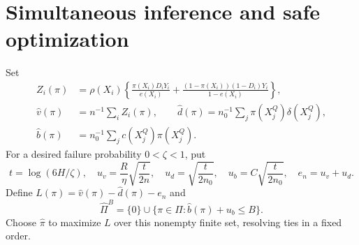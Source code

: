 \documentclass[11pt]{article}
\theoremstyle{remark}
\begin{document}
\section{Simultaneous inference and safe optimization}
Set
\begin{align*}
 Z_i(\pi)&=\rho(X_i)\left\{
 \frac{\pi(X_i)D_iY_i}{e(X_i)}+
 \frac{(1-\pi(X_i))(1-D_i)Y_i}{1-e(X_i)}\right\},\\
 \widehat v(\pi)&=n^{-1}\sum_i Z_i(\pi),\qquad
 \widehat d(\pi)=n_0^{-1}\sum_j\pi(X_j^Q)\delta(X_j^Q),\\
 \widehat b(\pi)&=n_0^{-1}\sum_jc(X_j^Q)\pi(X_j^Q).
\end{align*}
For a desired failure probability $0<\zeta<1$, put
\[
 t=\log(6H/\zeta),\quad
 u_v=\frac R\eta\sqrt{\frac{t}{2n}},\quad
 u_d=\sqrt{\frac{t}{2n_0}},\quad
 u_b=C\sqrt{\frac{t}{2n_0}},\quad e_n=u_v+u_d.
\]
Define $L(\pi)=\widehat v(\pi)-\widehat d(\pi)-e_n$ and
\[
 \widehat\Pi^B=\{0\}\cup
 \{\pi\in\Pi:\widehat b(\pi)+u_b\leq B\}.
\]
Choose $\widehat\pi$ to maximize $L$ over this nonempty finite set, resolving ties in a fixed order.
\end{document}
